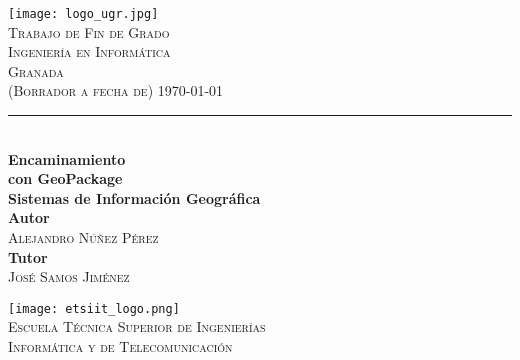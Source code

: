 \begin{titlepage}

\centering
\begin{minipage}{\textwidth}
\centering

\texttt{[image: logo\_ugr.jpg]}\\[6.75ex]

\textsc{ \Huge Trabajo de Fin de Grado }\\[1.5ex]
\textsc{ \LARGE Ingeniería en Informática }\\[3.5ex]

\textsc{ \Large Granada }\\[0.75ex]
\textsc{ \large (Borrador a fecha de) \today }\\[1.5ex]

\rule[1ex]{\textwidth}{1pt}\\[3.5ex]

\textbf{ \huge Encaminamiento \\[0.75ex] con GeoPackage }\\[3.5ex]
\textbf{ \large Sistemas de Información Geográfica }\\[4.25ex]

\textbf{ \Large Autor }\\[0.75ex]
	\textsc{ \large Alejandro Núñez Pérez }\\[2.25ex]
\textbf{ \Large Tutor }\\[0.75ex]
	\textsc{ \large José Samos Jiménez }\\[2.25ex]
\end{minipage}

\vfill

\centering
\begin{minipage}{\textwidth}
\centering
 
\texttt{[image: etsiit\_logo.png]}\\[0.75ex]
\textsc{ 
	Escuela Técnica Superior de Ingenierías \\[0.5ex]
		Informática y de Telecomunicación 
}\\[0ex]
\end{minipage}

\end{titlepage}

\blankpage
